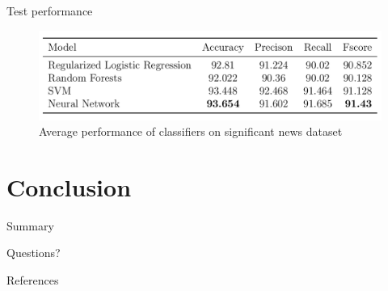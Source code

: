 \documentclass[12pt]{beamer}
\begin{document}
\begin{frame}{Test performance}
\begin{figure}[h]
    \includegraphics[width=\textwidth]{images/avg_performance.png}
    \caption{Average performance of classifiers on significant news dataset}
    \label{tbl:average_performance}
\end{figure}
\end{frame}

\section{Conclusion}

\begin{frame}{Summary}
\end{frame}

{
\begin{frame}[standout]
  Questions?
\end{frame}
}

\appendix

\begin{frame}[allowframebreaks]{References}
    
    
\end{frame}
\end{document}

